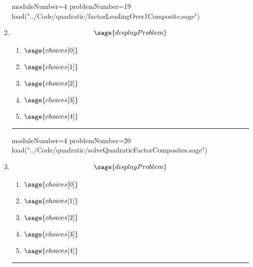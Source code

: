 \documentclass[14pt]{article}
\newcommand{\litem}[1]{\item#1\hspace*{-1cm}\rule{\textwidth}{0.4pt}}
\begin{document}
\begin{enumerate}
\begin{sagesilent}
moduleNumber=4
problemNumber=19
load("../Code/quadratic/factorLeadingOver1Composite.sage")
\end{sagesilent}

\litem{ 

  	\[ \sage{displayProblem} \]

	\begin{enumerate}[label=\Alph*.]
    \item \( \sage{choices[0]} \)
    \item \( \sage{choices[1]} \)
    \item \( \sage{choices[2]} \)
    \item \( \sage{choices[3]} \)
    \item \( \sage{choices[4]} \)
	\end{enumerate}

}

\begin{sagesilent}
moduleNumber=4
problemNumber=20
load("../Code/quadratic/solveQuadraticFactorComposites.sage")
\end{sagesilent}

\litem{ 

	\[ \sage{displayProblem} \]

	\begin{enumerate}[label=\Alph*.]
    \item \( \sage{choices[0]} \)
    \item \( \sage{choices[1]} \)
    \item \( \sage{choices[2]} \)
    \item \( \sage{choices[3]} \)
    \item \( \sage{choices[4]} \)
	\end{enumerate}
}

\end{enumerate}
\end{document}
